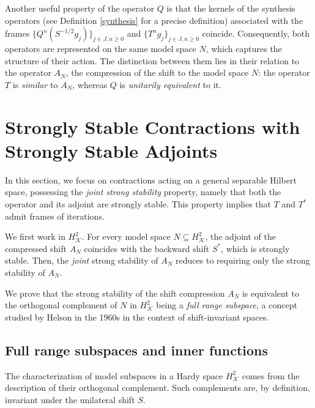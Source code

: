 \documentclass[a4paper,12pt]{amsart}
\def\KK{{\mathcal{K}}}
\theoremstyle{definition}
\begin{document}
Another useful property of the operator $Q$ is that the kernels of the synthesis operators (see Definition \ref{synthesis} for a precise definition) associated with the frames $\{Q^n(S^{-1/2} g_j)\}_{j\in J,n\geqslant0}$ and  $\{T^n g_j\}_{j\in J,n\geqslant0}$ coincide. Consequently, both operators are represented on the same model space $N$, which captures the structure of their action. The distinction between them lies in their relation to the operator $A_N$, the compression of the shift to the model space $N$: the operator $T$ is {\em similar} to $A_N$, whereas $Q$ is {\em unitarily equivalent} to it.

\section{Strongly Stable Contractions with Strongly Stable Adjoints}\label{full range}

In this section, we focus on contractions acting on a general separable Hilbert
space, possessing the {\em joint strong stability} property, namely that both the operator and its adjoint are strongly stable. This property implies that $T$ and $T^*$ admit frames of
iterations.

We first work in $H^2_\KK$. For every model space $N\subseteq H^2_\KK$, the adjoint of the compressed shift $A_N$ coincides with the backward shift $S^*$, which is strongly stable. Then, the {\em joint} strong stability of $A_N$ reduces to requiring only the strong stability of $A_N$. 

We prove that the strong stability of the shift compression $A_N$ is equivalent to the orthogonal complement of $N$ in $H^2_{\KK}$ being a {\em full range subspace}, a concept studied by Helson in the 1960s in the context of shift-invariant spaces.


\subsection{Full range subspaces and inner functions }\label{fullranges}
The characterization of model subspaces in a Hardy space $H^2_\KK$ comes from the description of their orthogonal complement. Such complements are, by definition, invariant under the unilateral shift $S$. 
\end{document}
